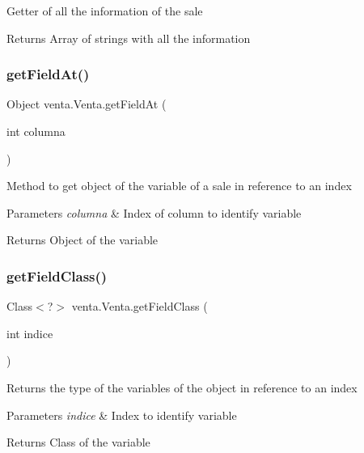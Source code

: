 Getter of all the information of the sale

\begin{DoxyReturn}{Returns}
Array of strings with all the information 
\end{DoxyReturn}
\mbox{\label{classventa_1_1_venta_a1b960ae8fc8ae2781ec32e46c2a9e78e}} 
\subsubsection{\texorpdfstring{get\+Field\+At()}{getFieldAt()}}
{\footnotesize\ttfamily Object venta.\+Venta.\+get\+Field\+At (\begin{DoxyParamCaption}\item[{int}]{columna }\end{DoxyParamCaption})}

Method to get object of the variable of a sale in reference to an index


\begin{DoxyParams}{Parameters}
{\em columna} & Index of column to identify variable \\
\hline
\end{DoxyParams}
\begin{DoxyReturn}{Returns}
Object of the variable 
\end{DoxyReturn}
\mbox{\label{classventa_1_1_venta_ad2b7e54e1e88a1e3af3d72c11f4331cb}} 
\subsubsection{\texorpdfstring{get\+Field\+Class()}{getFieldClass()}}
{\footnotesize\ttfamily Class$<$?$>$ venta.\+Venta.\+get\+Field\+Class (\begin{DoxyParamCaption}\item[{int}]{indice }\end{DoxyParamCaption})}

Returns the type of the variables of the object in reference to an index


\begin{DoxyParams}{Parameters}
{\em indice} & Index to identify variable \\
\hline
\end{DoxyParams}
\begin{DoxyReturn}{Returns}
Class of the variable 
\end{DoxyReturn}
\mbox{\label{classventa_1_1_venta_a82a6dd2795bd37dc1a72ffb5cb36a156}} 
